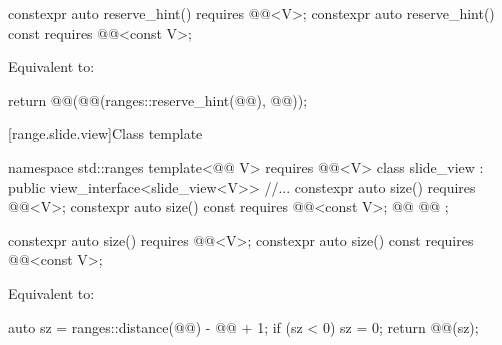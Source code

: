\documentclass{wg21}
\begin{document}
\begin{addedblock}
\begin{itemdecl}
    constexpr auto reserve_hint() requires @@<V>;
    constexpr auto reserve_hint() const requires @@<const V>;
\end{itemdecl}

\begin{itemdescr}
    \pnum
    \effects
    Equivalent to:
    \begin{codeblock}
        return @@(@@(ranges::reserve_hint(@@), @@));
    \end{codeblock}
\end{itemdescr}
\end{addedblock}

[range.slide.view]{Class template }

%
%
%
\begin{codeblock}
namespace std::ranges {
template<@@ V>
requires @@<V>
class slide_view : public view_interface<slide_view<V>> {
    //...
    constexpr auto size() requires @@<V>;
    constexpr auto size() const requires @@<const V>;
    @@
    @@
};
}
\end{codeblock}

\begin{itemdecl}
    constexpr auto size() requires @@<V>;
    constexpr auto size() const requires @@<const V>;
\end{itemdecl}

\begin{itemdescr}
    \pnum
    \effects
    Equivalent to:
    \begin{codeblock}
        auto sz = ranges::distance(@@) - @@ + 1;
        if (sz < 0) sz = 0;
        return @@(sz);
    \end{codeblock}
\end{itemdescr}
\end{document}
